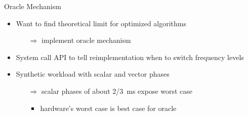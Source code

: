 \begin{frame}[t]{Oracle Mechanism}
	\begin{itemize}
		\item Want to find theoretical limit for optimized algorithms
		\begin{itemize}
			\item[$\Rightarrow$] implement oracle mechanism
		\end{itemize}
		\item System call API to tell reimplementation when to switch frequency levels
		\item Synthetic workload with scalar and vector phases
		\begin{itemize}
			\item[$\Rightarrow$] scalar phases of about \SI[quotient-mode=fraction]{2/3}{\milli\second} expose worst case
			\begin{itemize}
				\item hardware's worst case is best case for oracle
			\end{itemize}
		\end{itemize}
	\end{itemize}
\end{frame}